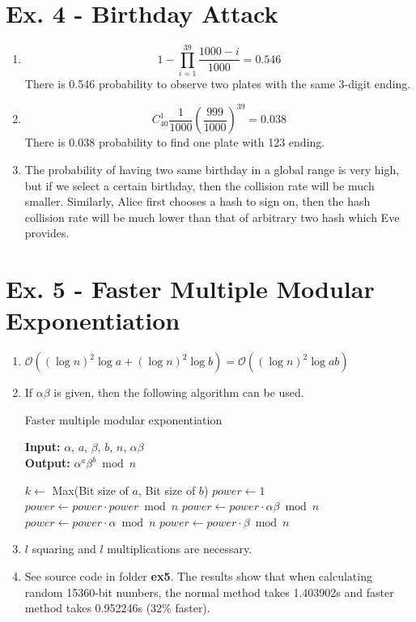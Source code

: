 \documentclass[12pt]{article}
\begin{document}
\section*{Ex. 4 - Birthday Attack}

	\begin{enumerate}
		\item
			$$1-\prod_{i=1}^{39}\frac{1000-i}{1000}=0.546$$
			There is 0.546 probability to observe two plates with the same 3-digit ending.
		\item
			$$C_{40}^1\frac{1}{1000}(\frac{999}{1000})^{39}=0.038$$
			There is 0.038 probability to find one plate with 123 ending.
		\item
			The probability of having two same birthday in a global range is very high, but if we select a certain birthday, then the collision rate will be much smaller. Similarly, Alice first chooses a hash to sign on, then the hash collision rate will be much lower than that of arbitrary two hash which Eve provides.
	\end{enumerate}

\section*{Ex. 5 - Faster Multiple Modular Exponentiation}

	\begin{enumerate}
		\item
			$\mathcal{O}((\log{n})^2\log{a}+(\log{n})^2\log{b})=\mathcal{O}((\log{n})^2\log{ab})$
		\item
			If $\alpha\beta$ is given, then the following algorithm can be used.
			\begin{algorithm}[H]
				\caption{Faster multiple modular exponentiation}
				\textbf{Input:} $\alpha$, $a$, $\beta$, $b$, $n$, $\alpha\beta$\\
				\textbf{Output:} $\alpha^a\beta^b\bmod n$
				\begin{algorithmic}
					\State $k\gets$ Max(Bit size of $a$, Bit size of $b$)
					\State $power \gets 1$
						\State $power \gets power \cdot power \bmod n$
							\State $power \gets power \cdot \alpha\beta \bmod n$
							\State $power \gets power \cdot \alpha \bmod n$
							\State $power \gets power \cdot \beta \bmod n$
						\EndIf
					\EndFor
					\State {}
				\end{algorithmic}
			\end{algorithm}
		\item
			$l$ squaring and $l$ multiplications are necessary.
		\item
			See source code in folder \textbf{ex5}. The results show that when calculating random 15360-bit numbers, the normal method takes 1.403902s and faster method takes 0.952246s (32\% faster).
	\end{enumerate}
\end{document}
